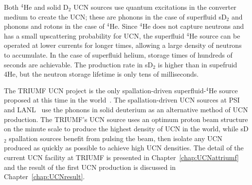 Both $^4$He and solid D$_2$ UCN sources use quantum excitations in the
converter medium to create the UCN; these are phonons in the case of
superfluid sD$_2$ and phonons and rotons in the case of $^4$He. Since
$^4$He does not capture neutrons and has a small upscattering
probability for UCN, the superfluid $^4$He source can be operated at
lower currents for longer times, allowing a large density of neutrons
to accumulate. In the case of superfluid helium, storage times of
hundreds of seconds are achievable. The production rate in sD$_2$ is
higher than in supefruid 4He, but the neutron storage lifetime is only
tens of milliseconds.

The TRIUMF UCN project is the only spallation-driven superfluid-$^4$He
source proposed at this time in the world~\cite{Ruediger}. The
spallation-driven UCN sources at PSI~\cite{Ries_ascona} and
LANL~\cite{Ito_ascona} use the phonons in solid deuterium as an
alternative method of UCN production.
The TRIUMF's UCN source uses an optimum proton beam structure on the
minute scale to produce the highest density of UCN in the world, while
sD$_2$ spallation sources benefit from pulsing the beam, then isolate
any UCN produced as quickly as possible to achieve high UCN densities.
The detail of the current UCN facility at TRIUMF is presented in
Chapter~\ref{chap:UCNattriumf} and the result of the first UCN
production is discussed in Chapter~\ref{chap:UCNresult}.










 

